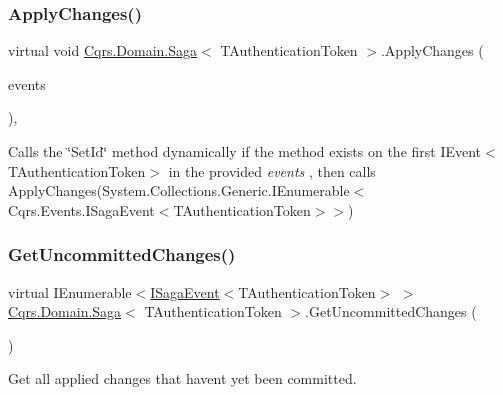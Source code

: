 \subsubsection{\texorpdfstring{Apply\+Changes()}{ApplyChanges()}\hspace{0.1cm}{\footnotesize\ttfamily [2/2]}}
{\footnotesize\ttfamily virtual void \hyperlink{classCqrs_1_1Domain_1_1Saga}{Cqrs.\+Domain.\+Saga}$<$ T\+Authentication\+Token $>$.Apply\+Changes (\begin{DoxyParamCaption}\item[{I\+Enumerable$<$ \hyperlink{interfaceCqrs_1_1Events_1_1IEvent}{I\+Event}$<$ T\+Authentication\+Token $>$$>$}]{events }\end{DoxyParamCaption})\hspace{0.3cm}{\ttfamily [protected]}, {\ttfamily [virtual]}}



Calls the \char`\"{}\+Set\+Id\char`\"{} method dynamically if the method exists on the first I\+Event$<$\+T\+Authentication\+Token$>$ in the provided {\itshape events} , then calls Apply\+Changes(\+System.\+Collections.\+Generic.\+I\+Enumerable$<$\+Cqrs.\+Events.\+I\+Saga\+Event$<$\+T\+Authentication\+Token$>$$>$) 

\mbox{\label{classCqrs_1_1Domain_1_1Saga_a759b30b518c7fa5037ec4041054f349c_a759b30b518c7fa5037ec4041054f349c}} 
\subsubsection{\texorpdfstring{Get\+Uncommitted\+Changes()}{GetUncommittedChanges()}}
{\footnotesize\ttfamily virtual I\+Enumerable$<$\hyperlink{interfaceCqrs_1_1Events_1_1ISagaEvent}{I\+Saga\+Event}$<$T\+Authentication\+Token$>$ $>$ \hyperlink{classCqrs_1_1Domain_1_1Saga}{Cqrs.\+Domain.\+Saga}$<$ T\+Authentication\+Token $>$.Get\+Uncommitted\+Changes (\begin{DoxyParamCaption}{ }\end{DoxyParamCaption})\hspace{0.3cm}{\ttfamily [virtual]}}



Get all applied changes that haven\textquotesingle{}t yet been committed. 




